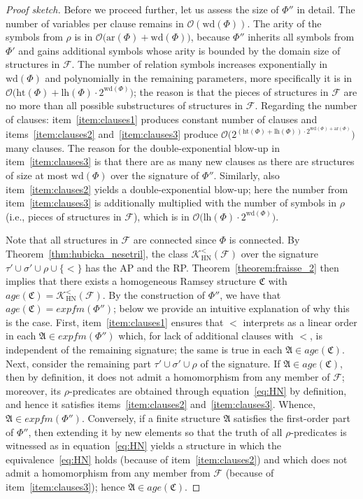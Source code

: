 \documentclass[oneside,reqno,12pt]{amsart}
\theoremstyle{plain}
\theoremstyle{remark}
\newcommand{\struct}[1]{\mathfrak{#1}}
\newcommand{\age}{\ensuremath{\mathit{age}}\xspace}
\newcommand{\efm}{\ensuremath{\mathit{expfm}}\xspace}
\newcommand{\hh}{\ensuremath{\mathrm{ht}}\xspace}
\newcommand{\lh}{\ensuremath{\mathrm{lh}}\xspace}
\newcommand{\wh}{\ensuremath{\mathrm{wd}}\xspace}
\newcommand{\ar}{\ensuremath{\mathrm{ar}}\xspace}
\begin{document}
{\begin{proof}[Proof sketch]
Before we proceed further, let us assess the size of $\Phi''$ in detail.
The number of variables per clause remains in $\mathcal{O}(\wh(\Phi))$.
The arity of the symbols from $\rho$ is in $\mathcal{O}\bigl(\ar(\Phi)+\wh(\Phi)\bigr)$, because $\Phi''$ inherits all symbols from $\Phi'$ and gains additional symbols whose arity is bounded by the domain size of structures in $\mathcal{F}$.
The number of relation symbols increases exponentially in $\wh(\Phi)$ and polynomially in the remaining parameters, more specifically it is in $\mathcal{O}\bigl(\hh(\Phi)+\lh(\Phi)\cdot 2^{\wh(\Phi)}\bigr)$; the reason is that the pieces of structures in $\mathcal{F}$ are no more than all possible substructures of structures in $\mathcal{F}$. 
Regarding the number of clauses: item~\eqref{item:clauses1} produces constant number of clauses and items~\eqref{item:clauses2} and~\eqref{item:clauses3} produce $\mathcal{O}\bigl(2^{(\hh(\Phi)+\lh(\Phi))\cdot 2^{\wh(\Phi)+\ar(\Phi)}} \bigr)$ many clauses.
The reason for the double-exponential blow-up in item~\eqref{item:clauses3} is that there are as many new clauses as there are structures of size at most $\wh(\Phi)$ over the signature of $\Phi''$.
Similarly, also item~\eqref{item:clauses2} yields a double-exponential blow-up; here the number from item~\eqref{item:clauses3} is additionally multiplied with the number of symbols in $\rho$ (i.e., pieces of structures in $\mathcal{F}$), which is in $\mathcal{O}\bigl(\lh(\Phi)\cdot 2^{\wh(\Phi)}\bigr)$.

Note that all structures in $\mathcal{F}$ are connected since $\Phi$ is connected.
By Theorem~\ref{thm:hubicka_nesetril}, the class $\mathcal{K}^{<}_{\mathrm{HN}}(\mathcal{F})$ over the signature $\tau'\cup\sigma'\cup \rho \cup \{<\}$ has the AP and the RP.
Theorem~\ref{theorem:fraisse_2} then implies that there exists a homogeneous Ramsey structure $\struct{C}$ with $\age(\struct{C})=\mathcal{K}^{<}_{\mathrm{HN}}(\mathcal{F})$.
By the construction of $\Phi''$, we have that $\age(\struct{C})=\efm(\Phi'')$; below we provide an intuitive explanation of why this is the case.
First, item~\eqref{item:clauses1} ensures that $<$ interprets as a linear order in each $\struct{A}\in \efm(\Phi'')$ which, for lack of additional clauses with $<$, is independent of the remaining signature; the same is true in each $\struct{A}\in \age(\struct{C})$.
Next, consider the remaining part $\tau'\cup \sigma'\cup\rho$ of the signature. If $\struct A\in\age(\struct C)$, then by definition, it does not admit a homomorphism from any member of $\mathcal F$; moreover,  its $\rho$-predicates are obtained through equation~\eqref{eq:HN} by definition, and hence it satisfies items~\eqref{item:clauses2} and~\eqref{item:clauses3}. Whence, $\struct A\in\efm{(\Phi'')}$. Conversely, if a finite structure  $\struct A$ satisfies the first-order part of $\Phi''$, then extending it by new elements so that the truth of all $\rho$-predicates is witnessed as in equation~\eqref{eq:HN} yields a structure in which the equivalence~\eqref{eq:HN} holds (because of item~\eqref{item:clauses2}) and which does not admit a homomorphism from any member from $\mathcal F$ (because of item~\eqref{item:clauses3}); hence $\struct A\in\age(\struct C)$.
 


\end{proof}}
\end{document}
